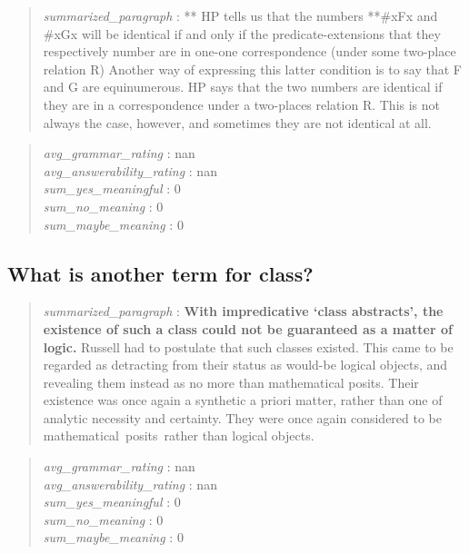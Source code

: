 \begin{quote}
\emph{summarized\_paragraph} : ** HP tells us that the numbers **\#xFx
and \#xGx will be identical if and only if the predicate-extensions that
they respectively number are in one-one correspondence (under some
two-place relation R) Another way of expressing this latter condition is
to say that F and G are equinumerous. HP says that the two numbers are
identical if they are in a correspondence under a two-places relation R.
This is not always the case, however, and sometimes they are not
identical at all.
\end{quote}

\begin{quote}
\emph{avg\_grammar\_rating} : nan\\
\emph{avg\_answerability\_rating} : nan\\
\emph{sum\_yes\_meaningful} : 0\\
\emph{sum\_no\_meaning} : 0\\
\emph{sum\_maybe\_meaning} : 0
\end{quote}

\hypertarget{what-is-another-term-for-class}{%
\subsection{What is another term for
class?}\label{what-is-another-term-for-class}}

\begin{quote}
\emph{summarized\_paragraph} : \textbf{With impredicative `class
abstracts', the existence of such a class could not be guaranteed as a
matter of logic.} Russell had to postulate that such classes existed.
This came to be regarded as detracting from their status as would-be
logical objects, and revealing them instead as no more than mathematical
posits. Their existence was once again a synthetic a priori matter,
rather than one of analytic necessity and certainty. They were once
again considered to be mathematical~posits~rather than logical objects.
\end{quote}

\begin{quote}
\emph{avg\_grammar\_rating} : nan\\
\emph{avg\_answerability\_rating} : nan\\
\emph{sum\_yes\_meaningful} : 0\\
\emph{sum\_no\_meaning} : 0\\
\emph{sum\_maybe\_meaning} : 0
\end{quote}
